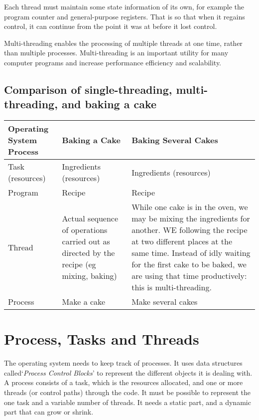 Each thread must maintain some state information of its own, for example the program counter and general-purpose registers. That is so that when it regains control, it can continue from the point it was at before it lost control. 

Multi-threading enables the processing of multiple threads at one time, rather than multiple processes. Multi-threading is an important utility for many computer programs and increase performance efficiency and scalability.

\subsection{Comparison of single-threading, multi-threading, and baking a cake}

\begin{table}[H]
    \centering
    \begin{tabular}{p{} p{} p{}}
        \textbf{Operating System Process} & \textbf{Baking a Cake} & \textbf{Baking Several Cakes}\\
        \hline
        \hline
        Task (resources) & Ingredients (resources) & Ingredients (resources)\\
        \hline
        Program & Recipe & Recipe \\
        \hline
        Thread & Actual sequence of operations carried out as directed by the recipe (eg mixing, baking) & While one cake is in the oven, we may be mixing the ingredients for another. WE following the recipe at two different places at the same time. Instead of idly waiting for the first cake to be baked, we are using that time productively: this is multi-threading.\\
        \hline
        Process & Make a cake & Make several cakes\\
        \hline
    \end{tabular}
\end{table}

\section{Process, Tasks and Threads}
The operating system needs to keep track of processes. It uses data structures called`\textit{Process Control Blocks}' to represent the different objects it is dealing with. A process consists of a task, which is the resources allocated, and one or more threads (or control paths) through the code. It must be possible to represent the one task and a variable number of threads. It needs a static part, and a dynamic part that can grow or shrink. 

